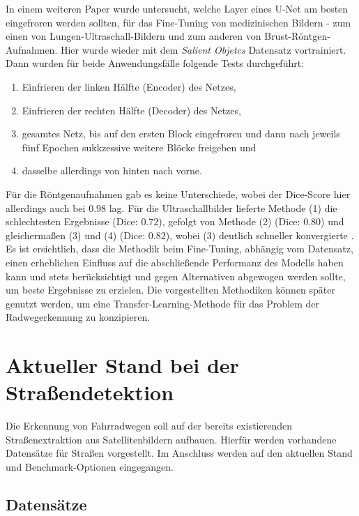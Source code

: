 In einem weiteren Paper wurde untersucht, welche Layer eines U-Net am besten eingefroren werden sollten, für das Fine-Tuning von medizinischen Bildern - 
zum einen von Lungen-Ultraschall-Bildern und zum anderen von Brust-Röntgen-Aufnahmen. 
Hier wurde wieder mit dem \textit{Salient Objetcs} Datensatz vortrainiert. Dann wurden für beide Anwendungsfälle folgende Tests durchgeführt: 
\begin{enumerate}
	\item Einfrieren der linken Hälfte (Encoder) des Netzes,
	\item Einfrieren der rechten Hälfte (Decoder) des Netzes,
	\item gesamtes Netz, bis auf den ersten Block eingefroren und dann nach jeweils fünf Epochen sukkzessive weitere Blöcke freigeben und
	\item dasselbe allerdings von hinten nach vorne.
\end{enumerate}
Für die Röntgenaufnahmen gab es keine Unterschiede, wobei der Dice-Score hier allerdings auch bei $0.98$ lag. 
Für die Ultraschallbilder lieferte Methode (1) die schlechtesten Ergebnisse (Dice: $0.72$), gefolgt von Methode (2) (Dice: $0.80$) 
und gleichermaßen (3) und (4) (Dice: $0.82$), wobei (3) deutlich schneller konvergierte \cite{Amiri.19.02.2020}. \\ 
Es ist ersichtlich, dass die Methodik beim Fine-Tuning, abhängig vom Datensatz, einen erheblichen Einfluss 
auf die abschließende Performanz des Modells haben kann und stets berücksichtigt und gegen Alternativen abgewogen werden sollte,
um beste Ergebnisse zu erzielen. Die vorgestellten Methodiken können später genutzt werden, 
um eine Transfer-Learning-Methode für das Problem der Radwegerkennung zu konzipieren. 


\section{Aktueller Stand bei der Straßendetektion}

Die Erkennung von Fahrradwegen soll auf der bereits existierenden Straßenextraktion aus Satellitenbildern aufbauen.
Hierfür werden vorhandene Datensätze für Straßen vorgestellt. 
Im Anschluss werden auf den aktuellen Stand und Benchmark-Optionen eingegangen.

\subsection{Datensätze} \label{sec:road-detection:roads-data}

